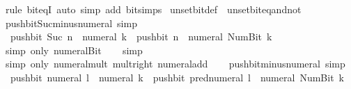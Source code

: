 \begin{isabellebody}
\endisadelimproof
%
\isatagproof
{}\isamarkupfalse%
\ {\isacharparenleft}{\kern0pt}rule\ bit{\isacharunderscore}{\kern0pt}eqI{\isacharparenright}{\kern0pt}\ {\isacharparenleft}{\kern0pt}auto\ simp\ add{\isacharcolon}{\kern0pt}\ bit{\isacharunderscore}{\kern0pt}simps{\isacharparenright}{\kern0pt}%
\endisatagproof
{\isafoldproof}%
%
\isadelimproof
\isanewline
%
\endisadelimproof
\isanewline
{}\isamarkupfalse%
\ unset{\isacharunderscore}{\kern0pt}bit{\isacharunderscore}{\kern0pt}def\ {\isacharequal}{\kern0pt}\ unset{\isacharunderscore}{\kern0pt}bit{\isacharunderscore}{\kern0pt}eq{\isacharunderscore}{\kern0pt}and{\isacharunderscore}{\kern0pt}not\isanewline
\isanewline
{}\isamarkupfalse%
\ push{\isacharunderscore}{\kern0pt}bit{\isacharunderscore}{\kern0pt}Suc{\isacharunderscore}{\kern0pt}minus{\isacharunderscore}{\kern0pt}numeral\ {\isacharbrackleft}{\kern0pt}simp{\isacharbrackright}{\kern0pt}{\isacharcolon}{\kern0pt}\isanewline
\ \ {\isacartoucheopen}push{\isacharunderscore}{\kern0pt}bit\ {\isacharparenleft}{\kern0pt}Suc\ n{\isacharparenright}{\kern0pt}\ {\isacharparenleft}{\kern0pt}{\isacharminus}{\kern0pt}\ numeral\ k{\isacharparenright}{\kern0pt}\ {\isacharequal}{\kern0pt}\ push{\isacharunderscore}{\kern0pt}bit\ n\ {\isacharparenleft}{\kern0pt}{\isacharminus}{\kern0pt}\ numeral\ {\isacharparenleft}{\kern0pt}Num{\isachardot}{\kern0pt}Bit{}\ k{\isacharparenright}{\kern0pt}{\isacharparenright}{\kern0pt}{\isacartoucheclose}\isanewline
%
\isadelimproof
\ \ %
\endisadelimproof
%
\isatagproof
{}\isamarkupfalse%
\ {\isacharparenleft}{\kern0pt}simp\ only{\isacharcolon}{\kern0pt}\ numeral{\isacharunderscore}{\kern0pt}Bit{}{\isacharparenright}{\kern0pt}\isanewline
\ \ \isamarkupfalse%
\ simp\isanewline
\ \ \isamarkupfalse%
\ {\isacharparenleft}{\kern0pt}simp\ only{\isacharcolon}{\kern0pt}\ numeral{\isacharunderscore}{\kern0pt}mult\ mult{\isacharunderscore}{\kern0pt}{}{\isacharunderscore}{\kern0pt}right\ numeral{\isacharunderscore}{\kern0pt}add{\isacharparenright}{\kern0pt}\isanewline
\ \ \isamarkupfalse%
%
\endisatagproof
{\isafoldproof}%
%
\isadelimproof
\isanewline
%
\endisadelimproof
\isanewline
{}\isamarkupfalse%
\ push{\isacharunderscore}{\kern0pt}bit{\isacharunderscore}{\kern0pt}minus{\isacharunderscore}{\kern0pt}numeral\ {\isacharbrackleft}{\kern0pt}simp{\isacharbrackright}{\kern0pt}{\isacharcolon}{\kern0pt}\isanewline
\ \ {\isacartoucheopen}push{\isacharunderscore}{\kern0pt}bit\ {\isacharparenleft}{\kern0pt}numeral\ l{\isacharparenright}{\kern0pt}\ {\isacharparenleft}{\kern0pt}{\isacharminus}{\kern0pt}\ numeral\ k{\isacharparenright}{\kern0pt}\ {\isacharequal}{\kern0pt}\ push{\isacharunderscore}{\kern0pt}bit\ {\isacharparenleft}{\kern0pt}pred{\isacharunderscore}{\kern0pt}numeral\ l{\isacharparenright}{\kern0pt}\ {\isacharparenleft}{\kern0pt}{\isacharminus}{\kern0pt}\ numeral\ {\isacharparenleft}{\kern0pt}Num{\isachardot}{\kern0pt}Bit{}\ k{\isacharparenright}{\kern0pt}{\isacharparenright}{\kern0pt}{\isacartoucheclose}\isanewline

\end{isabellebody}
